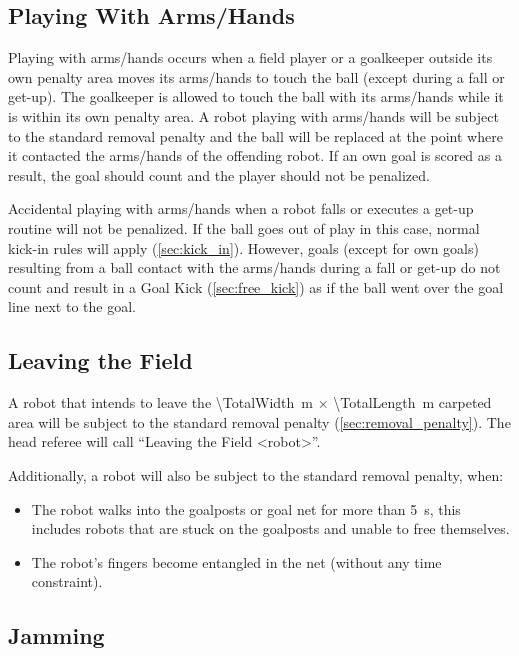 \subsection{Playing With Arms/Hands}
\label{sec:hand_ball}

Playing with arms/hands occurs when a field player or a goalkeeper outside its own penalty area moves its arms/hands to touch the ball (except during a fall or get-up).
The goalkeeper is allowed to touch the ball with its arms/hands while it is within its own penalty area.
A robot playing with arms/hands will be subject to the standard removal penalty and the ball will be replaced at the point where it contacted the arms/hands of the offending robot.
If an own goal is scored as a result, the goal should count and the player should not be penalized.

Accidental playing with arms/hands when a robot falls or executes a get-up routine will not be penalized.
If the ball goes out of play in this case, normal kick-in rules will apply (\cf \cref{sec:kick_in}).
However, goals (except for own goals) resulting from a ball contact with the arms/hands during a fall or get-up do not count and result in a Goal Kick (\cf \cref{sec:free_kick}) as if the ball went over the goal line next to the goal.

\subsection{Leaving the Field}
\label{sec:leaving_field}

A robot that intends to leave the \qty{\TotalWidth}{\metre} $\times$ \qty{\TotalLength}{\metre} carpeted area will be subject to the standard removal penalty (\cf \cref{sec:removal_penalty}).
The head referee will call ``Leaving the Field \textless robot\textgreater''.

Additionally, a robot will also be subject to the standard removal penalty, when:
\begin{itemize}
  \item The robot walks into the goalposts or goal net for more than \qty{5}{\second}, this includes robots that are stuck on the goalposts and unable to free themselves.
  \item The robot's fingers become entangled in the net (without any time constraint).
\end{itemize}

\subsection{Jamming}
\label{sec:jamming}

